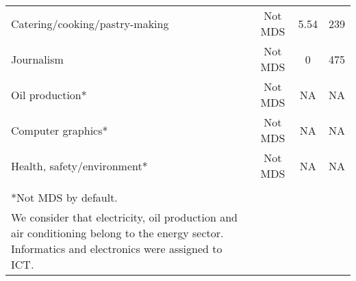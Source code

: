 {\begin{longtable}{m{9cm}ccc}
Catering/cooking/pastry-making&Not MDS&5.54&239\\
Journalism&Not MDS&0&475\\
Oil production*&Not MDS&NA&NA\\
Computer graphics*&Not MDS&NA&NA\\
Health, safety/environment*&Not MDS&NA&NA\\
\midrule
\begin{minipage}{17cm}
\small{
{\textit Notes:} \\
*Not MDS   by default. \\
We consider that electricity, oil production and air conditioning
belong to  the energy sector. Informatics and electronics
were assigned to ICT.
}
\end{minipage} \\* \bottomrule
\end{longtable}
}
